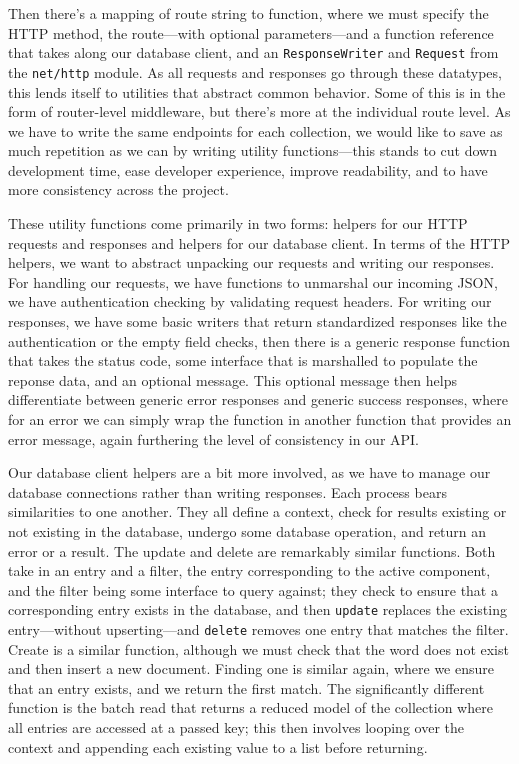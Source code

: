 \documentclass[11pt, twoside, reqno]{book}
\begin{document}
Then there's a mapping of route string to function, where we must specify the HTTP method, the route—with optional parameters—and a function reference that takes along our database client, and an \texttt{ResponseWriter} and \texttt{Request} from the \texttt{net/http} module. As all requests and responses go through these datatypes, this lends itself to utilities that abstract common behavior. Some of this is in the form of router-level middleware, but there's more at the individual route level. As we have to write the same endpoints for each collection, we would like to save as much repetition as we can by writing utility functions—this stands to cut down development time, ease developer experience, improve readability, and to have more consistency across the project.

These utility functions come primarily in two forms: helpers for our HTTP requests and responses and helpers for our database client. In terms of the HTTP helpers, we want to abstract unpacking our requests and writing our responses. For handling our requests, we have functions to unmarshal our incoming JSON, we have authentication checking by validating request headers. For writing our responses, we have some basic writers that return standardized responses like the authentication or the empty field checks, then there is a generic response function that takes the status code, some interface that is marshalled to populate the reponse data, and an optional message. This optional message then helps differentiate between generic error responses and generic success responses, where for an error we can simply wrap the function in another function that provides an error message, again furthering the level of consistency in our API.

Our database client helpers are a bit more involved, as we have to manage our database connections rather than writing responses. Each process bears similarities to one another. They all define a context, check for results existing or not existing in the database, undergo some database operation, and return an error or a result. The update and delete are remarkably similar functions. Both take in an entry and a filter, the entry corresponding to the active component, and the filter being some interface to query against; they check to ensure that a corresponding entry exists in the database, and then \texttt{update} replaces the existing entry—without upserting—and \texttt{delete} removes one entry that matches the filter. Create is a similar function, although we must check that the word does \textit{}not\textit{} exist and then insert a new document. Finding one is similar again, where we ensure that an entry exists, and we return the first match. The significantly different function is the batch read that returns a reduced model of the collection where all entries are accessed at a passed key; this then involves looping over the context and appending each existing value to a list before returning.
\end{document}
